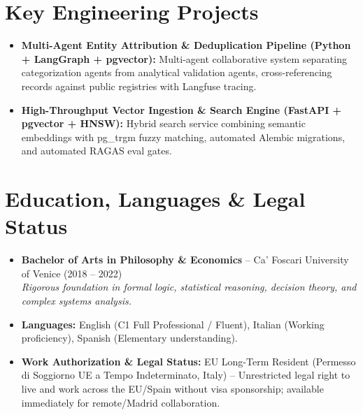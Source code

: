 \documentclass[a4paper,10pt]{article}
\begin{document}
\section{Key Engineering Projects}
\begin{itemize}
  \item \textbf{Multi-Agent Entity Attribution \& Deduplication Pipeline (Python + LangGraph + pgvector):} Multi-agent collaborative system separating categorization agents from analytical validation agents, cross-referencing records against public registries with Langfuse tracing.
  \item \textbf{High-Throughput Vector Ingestion \& Search Engine (FastAPI + pgvector + HNSW):} Hybrid search service combining semantic embeddings with pg\_trgm fuzzy matching, automated Alembic migrations, and automated RAGAS eval gates.
\end{itemize}

\section{Education, Languages \& Legal Status}
\begin{itemize}
  \item \textbf{Bachelor of Arts in Philosophy \& Economics} -- Ca' Foscari University of Venice (2018 -- 2022) \\
  \textit{Rigorous foundation in formal logic, statistical reasoning, decision theory, and complex systems analysis.}
  \item \textbf{Languages:} English (C1 Full Professional / Fluent), Italian (Working proficiency), Spanish (Elementary understanding).
  \item \textbf{Work Authorization \& Legal Status:} EU Long-Term Resident (Permesso di Soggiorno UE a Tempo Indeterminato, Italy) -- Unrestricted legal right to live and work across the EU/Spain without visa sponsorship; available immediately for remote/Madrid collaboration.
\end{itemize}
\end{document}
